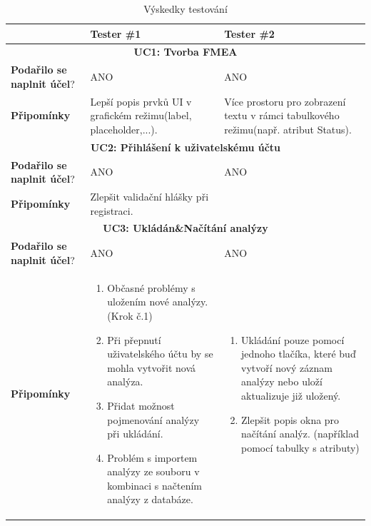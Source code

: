 \begin{table}[h]
	\caption{Výskedky testování}
	\label{tab:testovani}
\begin{tabular}{|p{3cm} | p{6cm} | p{6cm} |}
\hline
 & \textbf{Tester \#1} & \textbf{Tester \#2} \\ \hline
 \multicolumn{3}{|c|}{\textbf{UC1: Tvorba FMEA}} \\\hline
\textbf{Podařilo se \break naplnit účel}? & ANO & ANO\\ \hline
\textbf{Připomínky} & Lepší popis prvků UI v grafickém režimu(label, placeholder,...). & Více prostoru pro zobrazení textu v rámci tabulkového režimu(např. atribut Status). \\ \hline
 \multicolumn{3}{|c|}{\textbf{UC2: Přihlášení k uživatelskému účtu}} \\\hline
\textbf{Podařilo se \break naplnit účel}? & ANO & ANO\\ \hline
\textbf{Připomínky} & Zlepšit validační hlášky při registraci.  &  \\ \hline

 \multicolumn{3}{|c|}{\textbf{UC3: Ukládán\&Načítání analýzy}} \\\hline
\textbf{Podařilo se \break naplnit účel}? & ANO & ANO\\ \hline
\textbf{Připomínky} & 
\begin{enumerate}

    \item  Občasné problémy s uložením nové analýzy.(Krok č.1)
    \item  Při přepnutí uživatelského účtu by se mohla vytvořit nová analýza.
    \item  Přidat možnost pojmenování analýzy při ukládání.
    \item  Problém s importem analýzy ze souboru v kombinaci s načtením analýzy z databáze.

\end{enumerate}
  &  
  
  \begin{enumerate}
    \item  Ukládání pouze pomocí jednoho tlačíka, které buď vytvoří nový záznam analýzy nebo uloží aktualizuje již uložený.
    \item  Zlepšit popis okna pro načítání analýz. (například pomocí tabulky s atributy)

\end{enumerate} 
\\ \hline

\end{tabular}\  
\end{table}

